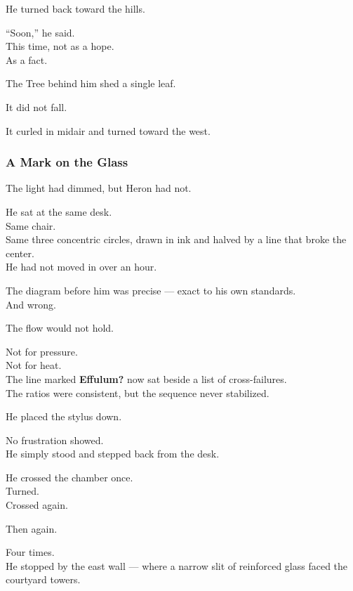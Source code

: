 \documentclass[12pt]{article}
\begin{document}
He turned back toward the hills.

“Soon,” he said.\\
This time, not as a hope.\\
As a fact.

\vspace{1em}

The Tree behind him shed a single leaf.

It did not fall.

It curled in midair and turned toward the west.

\dotfill

\subsubsection*{A Mark on the Glass}

The light had dimmed, but Heron had not.

He sat at the same desk.\\
Same chair.\\
Same three concentric circles, drawn in ink and halved by a line that broke the center.\\
He had not moved in over an hour.

The diagram before him was precise — exact to his own standards.\\
And wrong.

\vspace{1em}

The flow would not hold.

Not for pressure.\\
Not for heat.\\
The line marked \textbf{Effulum?} now sat beside a list of cross-failures.\\
The ratios were consistent, but the sequence never stabilized.

\vspace{1em}

He placed the stylus down.

No frustration showed.\\
He simply stood and stepped back from the desk.

He crossed the chamber once.\\
Turned.\\
Crossed again.

Then again.

Four times.\\
He stopped by the east wall — where a narrow slit of reinforced glass faced the courtyard towers.
\end{document}
